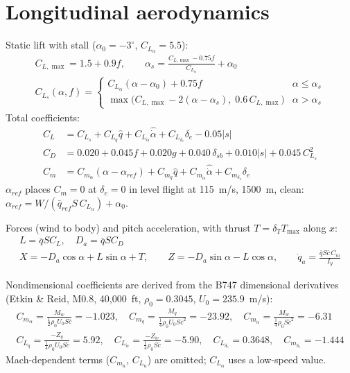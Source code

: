 \documentclass[10pt]{article}
\begin{document}
\section{Longitudinal aerodynamics}
Static lift with stall ($\alpha_0=-3^\circ$, $C_{L_\alpha}=5.5$):
\begin{gather*}
C_{L,\max}=1.5+0.9f,\qquad \alpha_s=\frac{C_{L,\max}-0.75f}{C_{L_\alpha}}+\alpha_0\\
C_{L_s}(\alpha,f)=\begin{cases}
C_{L_\alpha}(\alpha-\alpha_0)+0.75f & \alpha\le\alpha_s\\
\max\!\big(C_{L,\max}-2(\alpha-\alpha_s),\;0.6\,C_{L,\max}\big) & \alpha>\alpha_s
\end{cases}
\end{gather*}
Total coefficients:
\begin{align*}
C_L &= C_{L_s} + C_{L_q}\hat q + C_{L_{\dot\alpha}}\hat{\dot\alpha} + C_{L_{\delta_e}}\delta_e - 0.05|s|\\
C_D &= 0.020 + 0.045f + 0.020g + 0.040\,\delta_{sb} + 0.010|s| + 0.045\,C_{L_s}^2\\
C_m &= C_{m_\alpha}(\alpha-\alpha_{ref}) + C_{m_q}\hat q + C_{m_{\dot\alpha}}\hat{\dot\alpha} + C_{m_{\delta_e}}\delta_e
\end{align*}
$\alpha_{ref}$ places $C_m=0$ at $\delta_e=0$ in level flight at 115~m/s, 1500~m, clean:
$\alpha_{ref}=W/(\bar q_{ref}S\,C_{L_\alpha})+\alpha_0$.

Forces (wind to body) and pitch acceleration, with thrust $T=\delta_T T_{\max}$ along $x$:
\begin{gather*}
L=\bar q S C_L,\quad D_a=\bar q S C_D\\
X=-D_a\cos\alpha+L\sin\alpha+T,\qquad Z=-D_a\sin\alpha-L\cos\alpha,\qquad \dot q_a=\frac{\bar q S\bar c\,C_m}{I_y}
\end{gather*}

Nondimensional coefficients are derived from the B747 dimensional derivatives (Etkin \& Reid, M0.8, 40{,}000~ft,
$\rho_0=0.3045$, $U_0=235.9$~m/s):
\begin{gather*}
C_{m_\alpha}=\frac{M_w}{\tfrac12\rho_0U_0S\bar c}=-1.023,\quad
C_{m_q}=\frac{M_q}{\tfrac14\rho_0U_0S\bar c^2}=-23.92,\quad
C_{m_{\dot\alpha}}=\frac{M_{\dot w}}{\tfrac14\rho_0S\bar c^2}=-6.31\\
C_{L_q}=\frac{-Z_q}{\tfrac14\rho_0U_0S\bar c}=5.92,\quad
C_{L_{\dot\alpha}}=\frac{-Z_{\dot w}}{\tfrac14\rho_0S\bar c}=-5.90,\quad
C_{L_{\delta_e}}=0.3648,\quad C_{m_{\delta_e}}=-1.444
\end{gather*}
Mach-dependent terms ($C_{m_u}$, $C_{L_u}$) are omitted; $C_{L_\alpha}$ uses a low-speed value.
\end{document}
